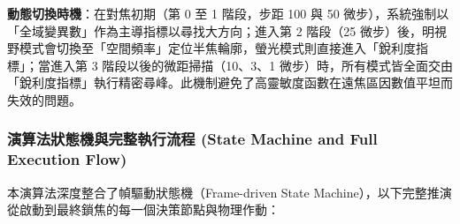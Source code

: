 \textbf{動態切換時機}：在對焦初期（第 0 至 1 階段，步距 100 與 50 微步），系統強制以「全域變異數」作為主導指標以尋找大方向；進入第 2 階段（25 微步）後，明視野模式會切換至「空間頻率」定位半焦輪廓，螢光模式則直接進入「銳利度指標」；當進入第 3 階段以後的微距掃描（10、3、1 微步）時，所有模式皆全面交由「銳利度指標」執行精密尋峰。此機制避免了高靈敏度函數在遠焦區因數值平坦而失效的問題。

\subsubsection{演算法狀態機與完整執行流程 (State Machine and Full Execution Flow)}

本演算法深度整合了幀驅動狀態機（Frame-driven State Machine），以下完整推演從啟動到最終鎖焦的每一個決策節點與物理作動：


